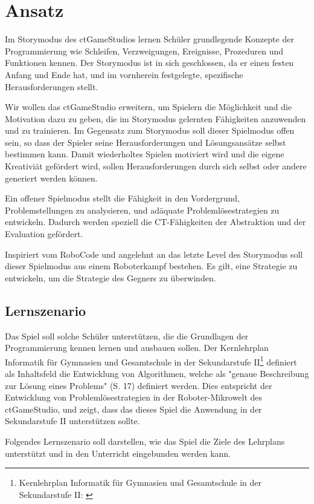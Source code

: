 \chapter{Ansatz}

Im Storymodus des ctGameStudios lernen Schüler grundlegende Konzepte der Programmierung wie
Schleifen, Verzweigungen, Ereignisse, Prozeduren und Funktionen kennen. Der Storymodus ist in sich
geschlossen, da er einen festen Anfang und Ende hat, und im vornherein festgelegte, spezifische
Herausforderungen stellt.

Wir wollen das ctGameStudio erweitern, um Spielern die Möglichkeit und die Motivation dazu zu geben,
die im Storymodus gelernten Fähigkeiten anzuwenden und zu trainieren. Im Gegensatz zum Storymodus
soll dieser Spielmodus offen sein, so dass der Spieler seine Herausforderungen und Lösungsansätze
selbst bestimmen kann. Damit wiederholtes Spielen motiviert wird und die eigene Kreativiät gefördert
wird, sollen Herausforderungen durch sich selbst oder andere generiert werden können. 

Ein offener Spielmodus stellt die Fähigkeit in den Vordergrund, Problemstellungen zu analysieren,
und adäquate Problemlösestrategien zu entwickeln. Dadurch werden speziell die CT-Fähigkeiten der
Abstraktion und der Evaluation gefördert.

Inspiriert vom RoboCode und angelehnt an das letzte Level des Storymodus soll dieser Spielmodus aus
einem Roboterkampf bestehen. Es gilt, eine Strategie zu entwickeln, um die Strategie des Gegners zu
überwinden.

\section{Lernszenario}

Das Spiel soll solche Schüler unterstützen, die die Grundlagen der Programmierung kennen lernen und
ausbauen sollen. Der Kernlehrplan Informatik für Gymnasien und Gesamtschule in der Sekundarstufe
II\footnote{Kernlehrplan Informatik für Gymnasien und Gesamtschule in der Sekundarstufe II:
\cite{SchulministeriumNRW2014}} definiert als Inhaltsfeld die Entwicklung von Algorithmen, welche
als "genaue Beschreibung zur Lösung eines Problems" (S. 17) definiert werden. Dies entspricht der
Entwicklung von Problemlösestrategien in der Roboter-Mikrowelt des ctGameStudio, und zeigt, dass das
dieses Spiel die Anwendung in der Sekundarstufe II unterstützen sollte.

Folgendes Lernszenario soll darstellen, wie das Spiel die Ziele des Lehrplans unterstützt und in den
Unterricht eingebunden werden kann.

